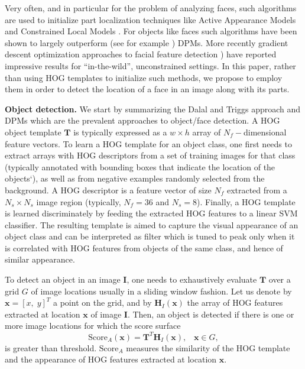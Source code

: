 \documentclass[runningheads]{llncs}
\begin{document}
Very often, and in particular for the problem of analyzing faces, such algorithms are used to initialize part localization techniques like Active Appearance Models \cite{cootes2001active, matthews2004active} and Constrained Local Models \cite{cristinacce2008automatic,saragih2011deformable}. For objects like faces such algorithms have been shown to largely outperform (see for example \cite{asthana2013robust}) DPMs. More recently gradient descent optimization approaches to facial feature detection \cite{xiongsupervised, tzimiropoulosoptimization}) have reported impressive results for ``in-the-wild'', unconstrained settings. In this paper, rather than using HOG templates to initialize such methods, we propose to employ them in order to detect the location of a face in an image along with its parts.

\textbf{Object detection.} We start by summarizing the Dalal and Triggs approach and DPMs which are the prevalent approaches to object/face detection. A HOG object template $\mathbf{T}$ is typically expressed as a $w \times h$ array of $N_f-$dimensional feature vectors. To learn a HOG template for an object class, one first needs to extract arrays with HOG descriptors from a set of training images for that class (typically annotated with bounding boxes that indicate the location of the objects`), as well as from negative examples randomly selected from the background. A HOG descriptor is a feature vector of size $N_f$ extracted from a $N_s \times N_s$ image region (typically, $N_f=36$ and $N_s=8$). Finally, a HOG template is learned discriminately by feeding the extracted HOG features to a linear SVM classifier. The resulting template is aimed to capture the visual appearance of an object class and can be interpreted as filter which is tuned to peak only when it is correlated with HOG features from objects of the same class, and hence of similar appearance.

To detect an object in an image $\mathbf{I}$, one needs to exhaustively evaluate $\mathbf{T}$ over a grid $G$ of image locations usually in a sliding window fashion. Let us denote by $\mathbf{x} = [x, \; y]^T$ a point on the grid, and by $\mathbf{H}_I(\mathbf{x})$ the array of HOG features extracted at location $\mathbf{x}$ of image $\mathbf{I}$. Then, an object is detected if there is one or more image locations for which the score surface
\begin{equation}
\textrm{Score}_A(\mathbf{x}) = \mathbf{T}^T \mathbf{H}_I(\mathbf{x}), \;\;\; \mathbf{x} \in G, \label{E:S}
\end{equation}
is greater than threshold. $\textrm{Score}_A$ measures the similarity of the HOG template and the appearance of HOG features extracted at location $\mathbf{x}.$ 
\end{document}
